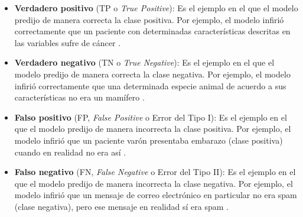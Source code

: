 \begin{itemize}
	\item \textbf{Verdadero positivo} (TP o \textit{True Positive}): Es el ejemplo en el que el modelo predijo de manera correcta la clase positiva. Por ejemplo, el modelo infirió correctamente que un paciente con determinadas características descritas en las variables sufre de cáncer \parencite{gl_google2018machinelearning}.
	\item \textbf{Verdadero negativo} (TN o \textit{True Negative}): Es el ejemplo en el que el modelo predijo de manera correcta la clase negativa. Por ejemplo, el modelo infirió correctamente que una determinada especie animal de acuerdo a sus características no era un mamífero \parencite{gl_google2018machinelearning}.
	\item \textbf{Falso positivo} (FP, \textit{False Positive} o Error del Tipo I): Es el ejemplo en el que el modelo predijo de manera incorrecta la clase positiva. Por ejemplo, el modelo infirió que un paciente varón presentaba embarazo (clase positiva) cuando en realidad no era así \parencite{gl_google2018machinelearning}.
	\item \textbf{Falso negativo} (FN, \textit{False Negative} o Error del Tipo II): Es el ejemplo en el que el modelo predijo de manera incorrecta la clase negativa. Por ejemplo, el modelo infirió que un mensaje de correo electrónico en particular no era spam (clase negativa), pero ese mensaje en realidad sí era spam \parencite{gl_google2018machinelearning}. 
\end{itemize}


